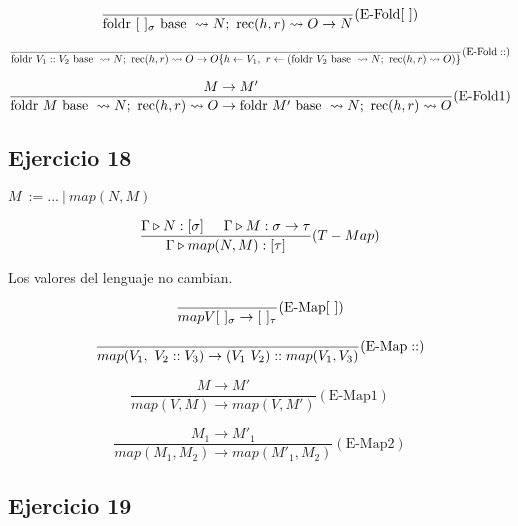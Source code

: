 \documentclass[10pt,a4paper, landscape]{article}
\begin{document}
\vspace*{5mm}
$$\frac{}{\text{foldr } [~]_{\sigma} \text{ base }\leadsto N;~\text{rec}(h, r)\leadsto O\to N}(\text{E-Fold}[~])$$

\vspace*{5mm}
$$\frac{}{\text{foldr } V_1::V_2 \text{ base }\leadsto N;~\text{rec}(h, r)\leadsto O\to O\{h\leftarrow V_1,~r\leftarrow(\text{foldr } V_2 \text{ base }\leadsto N;~\text{rec}(h, r)\leadsto O)\}}(\text{E-Fold}::)$$

\vspace*{5mm}
$$\frac{M\to M'}{\text{foldr } M \text{ base }\leadsto N;~\text{rec}(h, r)\leadsto O\to\text{foldr } M' \text{ base }\leadsto N;~\text{rec}(h, r)\leadsto O}(\text{E-Fold}\text{1})$$


\subsection{Ejercicio 18}
\begin{multicols}{2}
$M~:= ...~|~map(N,M)$

$$\frac{\Gamma\triangleright N : [\sigma]\hspace*{5mm}\Gamma\triangleright M : \sigma\to\tau}{\Gamma\triangleright map(N,M) : [\tau]}(T-Map)$$

\vspace*{5mm}
Los valores del lenguaje no cambian.

\vspace*{5mm}
$$\frac{}{map{V}{[~]_{\sigma}}\to [~]_{\tau}}(\text{E-Map}[~])$$

\vspace*{5mm}
$$\frac{}{map(V_1,~V_2 :: V_3)\to (V_1~V_2)::map(V_1,V_3)}(\text{E-Map}::)$$

\vspace*{5mm}
$$\frac{M\to M'}{map(V, M)\to map(V,M')}(\text{E-Map1})$$

\vspace*{5mm}
$$\frac{M_1\to M'_1}{map(M_1, M_2)\to map(M'_1,M_2)}(\text{E-Map2})$$
\end{multicols}

\newpage
\subsection{Ejercicio 19}
\end{document}
